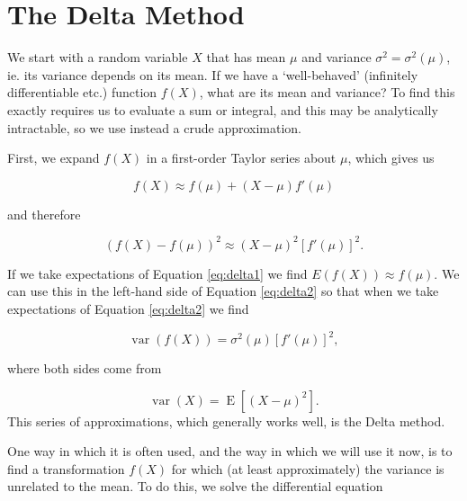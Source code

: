 \documentclass[
  openany]{book}
\theoremstyle{definition}
\theoremstyle{definition}
\theoremstyle{definition}
\theoremstyle{definition}
\theoremstyle{remark}
\begin{document}
\section{The Delta Method}\label{delta-method}

We start with a random variable \(X\) that has mean \(\mu\) and variance \(\sigma^2 = \sigma^2\left(\mu\right)\), ie. its variance depends on its mean. If we have a `well-behaved' (infinitely differentiable etc.) function \(f\left(X\right)\), what are its mean and variance? To find this exactly requires us to evaluate a sum or integral, and this may be analytically intractable, so we use instead a crude approximation.

First, we expand \(f\left(X\right)\) in a first-order Taylor series about \(\mu\), which gives us

\begin{equation} 
      f\left(X\right) \approx f\left(\mu\right) + \left(X-\mu\right)f'\left(\mu\right)
\label{eq:delta1}
\end{equation}

and therefore

\begin{equation} 
\left(f\left(X\right) - f\left(\mu\right)\right)^2 \approx \left(X-\mu\right)^2\left[f'\left(\mu\right)\right]^2.
\label{eq:delta2}
\end{equation}

If we take expectations of Equation \eqref{eq:delta1} we find \(E\left(f\left(X\right)\right) \approx f\left(\mu\right)\). We can use this in the left-hand side of Equation \eqref{eq:delta2} so that when we take expectations of Equation \eqref{eq:delta2} we find

\begin{equation} 
  \operatorname{var}\left(f\left(X\right)\right) = \sigma^2\left(\mu\right)\left[f'\left(\mu\right)\right]^2,
\label{eq:delta3}
\end{equation}

where both sides come from

\[\operatorname{var}\left(X\right) = \operatorname{E}\left[\left(X - \mu\right)^2\right] .\]
This series of approximations, which generally works well, is the Delta method.

One way in which it is often used, and the way in which we will use it now, is to find a transformation \(f\left(X\right)\) for which (at least approximately) the variance is unrelated to the mean. To do this, we solve the differential equation
\end{document}
